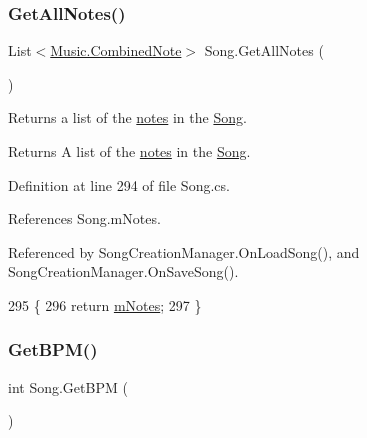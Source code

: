 \mbox{\label{group___song_pub_func_ga842675b7691fca074ee394031afc7675}} 
\subsubsection{\texorpdfstring{Get\+All\+Notes()}{GetAllNotes()}}
{\footnotesize\ttfamily List$<$\hyperlink{group___music_structs_struct_music_1_1_combined_note}{Music.\+Combined\+Note}$>$ Song.\+Get\+All\+Notes (\begin{DoxyParamCaption}{ }\end{DoxyParamCaption})}



Returns a list of the \hyperlink{group___music_structs_struct_music_1_1_combined_note}{notes} in the \hyperlink{class_song}{Song}. 

\begin{DoxyReturn}{Returns}
A list of the \hyperlink{group___music_structs_struct_music_1_1_combined_note}{notes} in the \hyperlink{class_song}{Song}. 
\end{DoxyReturn}


Definition at line 294 of file Song.\+cs.



References Song.\+m\+Notes.



Referenced by Song\+Creation\+Manager.\+On\+Load\+Song(), and Song\+Creation\+Manager.\+On\+Save\+Song().


\begin{DoxyCode}
295     \{
296         \textcolor{keywordflow}{return} \hyperlink{group___song_priv_var_ga674bc904a1f856d485d5fb7fe84bac85}{mNotes};
297     \}
\end{DoxyCode}
\mbox{\label{group___song_pub_func_gaaaf3d27d474713d7d368e3fd4c570be0}} 
\subsubsection{\texorpdfstring{Get\+B\+P\+M()}{GetBPM()}}
{\footnotesize\ttfamily int Song.\+Get\+B\+PM (\begin{DoxyParamCaption}{ }\end{DoxyParamCaption})}



